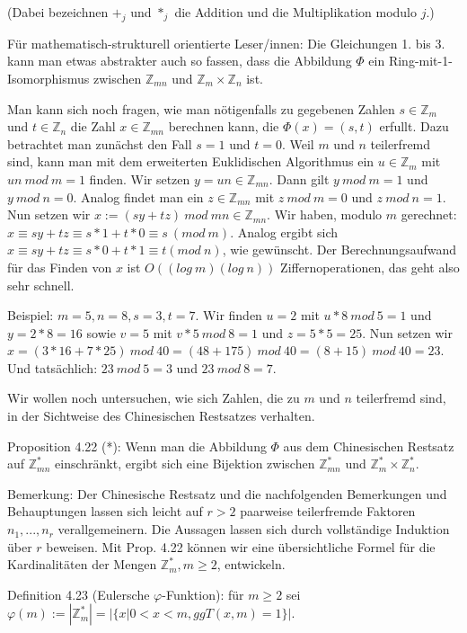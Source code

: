 \documentclass[a4paper]{article}
\begin{document}
\begin{multicols}{3}
(Dabei bezeichnen $+_j$ und $*_j$ die Addition und die Multiplikation modulo $j$.)

Für mathematisch-strukturell orientierte Leser/innen: Die Gleichungen 1. bis 3. kann man etwas abstrakter auch so fassen, dass die Abbildung $\Phi$ ein Ring-mit-1-Isomorphismus zwischen $\mathbb{Z}_{mn}$ und $\mathbb{Z}_m \times\mathbb{Z}_n$ ist.

Man kann sich noch fragen, wie man nötigenfalls zu gegebenen Zahlen $s\in\mathbb{Z}_m$ und $t\in\mathbb{Z}_n$ die Zahl $x\in\mathbb{Z}_{mn}$ berechnen kann, die $\Phi(x)=(s,t)$ erfullt. Dazu betrachtet man zunächst den Fall $s=1$ und $t=0$. Weil $m$ und $n$ teilerfremd sind, kann man mit dem erweiterten Euklidischen Algorithmus ein $u\in\mathbb{Z}_{m}$ mit $un\ mod\ m=1$ 
finden. Wir setzen $y=un\in\mathbb{Z}_{mn}$. Dann gilt $y\ mod\ m=1$ und $y\ mod\ n=0$. Analog findet man ein $z\in\mathbb{Z}_{mn}$ mit $z\ mod\ m=0$ und $z\ mod\ n=1$. Nun setzen wir $x:=(sy+tz)\ mod\ mn\in\mathbb{Z}_{mn}$. Wir haben, modulo $m$ gerechnet: $x\equiv sy+tz\equiv s*1+t* 0 \equiv s\ (mod\ m)$. Analog ergibt sich $x\equiv sy+tz\equiv s*0+t*1 \equiv t(mod\ n)$, wie gewünscht. Der Berechnungsaufwand für das Finden von $x$ ist $O((log\ m)(log\ n))$ Ziffernoperationen, das geht also sehr schnell.

Beispiel: $m=5,n=8,s=3,t=7$. Wir finden $u=2$ mit $u*8\ mod\ 5 = 1$ und $y= 2*8=16$ sowie $v=5$ mit $v*5\ mod\ 8=1$ und $z=5*5=25$. Nun setzen wir $x=(3*16+7*25) \ mod\ 40=(48+175)\ mod\ 40 = (8 + 15)\ mod\ 40 = 23$. Und tatsächlich: $23\ mod\ 5 = 3$ und $23\ mod\ 8 = 7$.

Wir wollen noch untersuchen, wie sich Zahlen, die zu $m$ und $n$ teilerfremd sind, in der Sichtweise des Chinesischen Restsatzes verhalten.

Proposition 4.22 (*): Wenn man die Abbildung $\Phi$ aus dem Chinesischen Restsatz auf $\mathbb{Z}^*_{mn}$ einschränkt, ergibt sich eine Bijektion zwischen $\mathbb{Z}^*_{mn}$ und $\mathbb{Z}^*_m\times\mathbb{Z}^*_n$.

Bemerkung: Der Chinesische Restsatz und die nachfolgenden Bemerkungen und Behauptungen lassen sich leicht auf $r>2$ paarweise teilerfremde Faktoren $n_1,...,n_r$
verallgemeinern. Die Aussagen lassen sich durch vollständige Induktion über $r$ beweisen. Mit Prop. 4.22 können wir eine übersichtliche Formel für die Kardinalitäten der Mengen $\mathbb{Z}^*_m, m\geq 2$, entwickeln.

Definition 4.23 (Eulersche $\varphi$-Funktion): für $m\geq 2$ sei $\varphi(m):=|\mathbb{Z}^*_m| =|\{x| 0<x<m,ggT(x,m) = 1\}|$.


\end{multicols}
\end{document}
